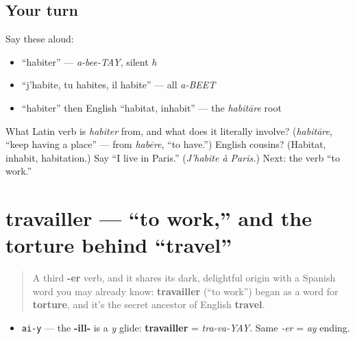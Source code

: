 \subsection*{Your turn}
Say these aloud:

\begin{itemize}
\raggedright
  \item \textquotedblleft{}habiter\textquotedblright{} — \emph{a-bee-TAY}, silent \emph{h}
  \item \textquotedblleft{}j'habite, tu habites, il habite\textquotedblright{} — all \emph{a-BEET}
  \item \textquotedblleft{}habiter\textquotedblright{} then English \textquotedblleft{}habitat, inhabit\textquotedblright{} — the \emph{habitāre} root
\end{itemize}

\begin{tcolorbox}[breakable,colback=teal!4,colframe=teal!35!black,title={Before you move on}]
What Latin verb is \emph{habiter} from, and what does it literally involve? (\emph{habitāre}, \textquotedblleft{}keep having a place\textquotedblright{} — from \emph{habēre}, \textquotedblleft{}to have.\textquotedblright{}) English cousins? (Habitat, inhabit, habitation.) Say \textquotedblleft{}I live in Paris.\textquotedblright{} (\emph{J'habite à Paris.}) Next: the verb \textquotedblleft{}to work.\textquotedblright{}
\end{tcolorbox}
\section[travailler]{travailler — \textquotedblleft{}to work,\textquotedblright{} and the torture behind \textquotedblleft{}travel\textquotedblright{}}

\label{lesson:FR-C05-travailler}



\begin{quote}
A third \textbf{-er} verb, and it shares its dark, delightful origin with a Spanish word you may already know: \textbf{travailler} (\textquotedblleft{}to work\textquotedblright{}) began as a word for \textbf{torture}, and it's the secret ancestor of English \textbf{travel}.
\end{quote}

\begin{sounds}
\begin{itemize}
\raggedright
  \item \texttt{ai-y} — the \textbf{-ill-} is a \emph{y} glide: \textbf{travailler} = \emph{tra-va-YAY}. Same \emph{-er} = \emph{ay} ending.
\end{itemize}
\end{sounds}

